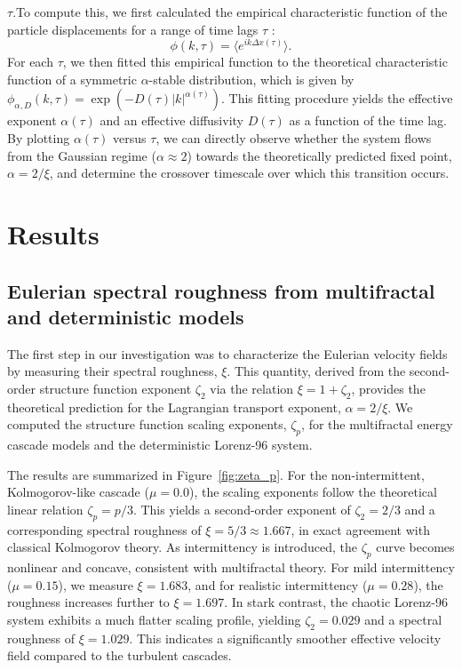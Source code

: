 \documentclass[]{article}
\begin{document}
$\tau$.To compute this, we first calculated the empirical characteristic function of the particle displacements for a range of time lags $\tau$  \citep{kaiser2026limittheoremsempiricaldistribution}:\begin{equation}\phi(k, \tau) = \langle e^{ik\Delta x(\tau)} \rangle.\end{equation}For each $\tau$, we then fitted this empirical function to the theoretical characteristic function of a symmetric $\alpha$-stable distribution, which is given by $\phi_{\alpha, D}(k, \tau) = \exp(-D(\tau)|k|^{\alpha(\tau)})$. This fitting procedure yields the effective exponent $\alpha(\tau)$ and an effective diffusivity $D(\tau)$ as a function of the time lag. By plotting $\alpha(\tau)$ versus $\tau$, we can directly observe whether the system flows from the Gaussian regime ($\alpha \approx 2$) towards the theoretically predicted fixed point, $\alpha = 2/\xi$, and determine the crossover timescale over which this transition occurs.

\section{Results}
\label{sec:results}
\subsection{Eulerian spectral roughness from multifractal and deterministic models}

The first step in our investigation was to characterize the Eulerian velocity fields by measuring their spectral roughness, $\xi$. This quantity, derived from the second-order structure function exponent $\zeta_2$ via the relation $\xi = 1 + \zeta_2$, provides the theoretical prediction for the Lagrangian transport exponent, $\alpha = 2/\xi$. We computed the structure function scaling exponents, $\zeta_p$, for the multifractal energy cascade models and the deterministic Lorenz-96 system.

The results are summarized in Figure~\ref{fig:zeta_p}. For the non-intermittent, Kolmogorov-like cascade ($\mu=0.0$), the scaling exponents follow the theoretical linear relation $\zeta_p = p/3$. This yields a second-order exponent of $\zeta_2 = 2/3$ and a corresponding spectral roughness of $\xi = 5/3 \approx 1.667$, in exact agreement with classical Kolmogorov theory. As intermittency is introduced, the $\zeta_p$ curve becomes nonlinear and concave, consistent with multifractal theory. For mild intermittency ($\mu=0.15$), we measure $\xi = 1.683$, and for realistic intermittency ($\mu=0.28$), the roughness increases further to $\xi = 1.697$. In stark contrast, the chaotic Lorenz-96 system exhibits a much flatter scaling profile, yielding $\zeta_2 = 0.029$ and a spectral roughness of $\xi = 1.029$. This indicates a significantly smoother effective velocity field compared to the turbulent cascades.
\end{document}
